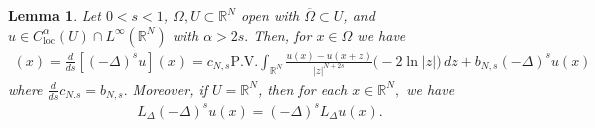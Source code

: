 \documentclass[notitlepage,11pt,reqno]{amsart}
\newtheorem{lemma}[theorem]{Lemma}
\theoremstyle{definition}
\numberwithin{equation}{section}
\newcommand{\loc}{\mathrm{loc}}
\newcommand{\RR}{\mathds{R}}
\begin{document}
\begin{lemma}\label{rep c1}
Let $0<s<1$, $\Omega,U\subset \RR^N$ open with $\overline{\Omega}\subset U$, and $u \in C^{\alpha}_{\loc}(U)\cap L^{\infty}(\RR^N)$ with $\alpha >2s.$ Then, for $x \in \Omega$ we have
\begin{align*}
 [(-\Delta)^{s+\mathrm{Log}}u](x)=\frac{d}{ds}[(-\Delta)^su](x)= c_{N,s}\text{P.V.}\int_{\RR^N} \frac{u(x)-u(x+z)}{|z|^{N+2s}}\bigl(-2\ln|z|\bigr)\,dz+b_{N,s}(-\Delta)^s u(x)  
\end{align*}
 where $\frac{d}{ds}c_{N.s}=b_{N, s}.$ Moreover, if $U=\RR^N$, then for each $x \in \RR^N,$ we have
 \begin{align}\label{commute-fractional-log}
 L_{\Delta}(-\Delta)^s u(x)=(-\Delta)^sL_{\Delta}u(x).
 \end{align}
\end{lemma}
\end{document}
